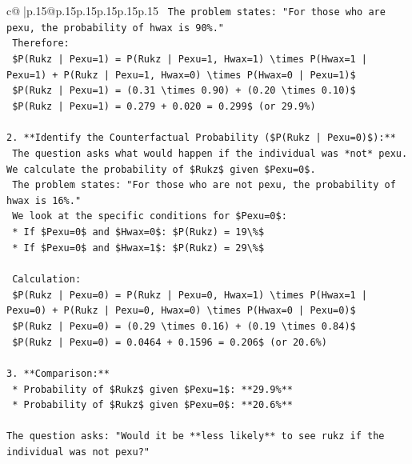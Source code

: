 \documentclass{article}
\begin{document}
{\begin{supertabular}{c@{$\;$}|p{.15\linewidth}@{}p{.15\linewidth}p{.15\linewidth}p{.15\linewidth}p{.15\linewidth}p{.15\linewidth}}
{{{\texttt{    The problem states: "For those who are pexu, the probability of hwax is 90\%."} \\
\texttt{    Therefore:} \\
\texttt{    \$P(Rukz | Pexu=1) = P(Rukz | Pexu=1, Hwax=1) \textbackslash{}times P(Hwax=1 | Pexu=1) + P(Rukz | Pexu=1, Hwax=0) \textbackslash{}times P(Hwax=0 | Pexu=1)\$} \\
\texttt{    \$P(Rukz | Pexu=1) = (0.31 \textbackslash{}times 0.90) + (0.20 \textbackslash{}times 0.10)\$} \\
\texttt{    \$P(Rukz | Pexu=1) = 0.279 + 0.020 = 0.299\$ (or 29.9\%)} \\
\\ 
\texttt{2.  **Identify the Counterfactual Probability (\$P(Rukz | Pexu=0)\$):**} \\
\texttt{    The question asks what would happen if the individual was *not* pexu. We calculate the probability of \$Rukz\$ given \$Pexu=0\$.} \\
\texttt{    The problem states: "For those who are not pexu, the probability of hwax is 16\%."} \\
\texttt{    We look at the specific conditions for \$Pexu=0\$:} \\
\texttt{    *   If \$Pexu=0\$ and \$Hwax=0\$: \$P(Rukz) = 19\textbackslash{}\%\$} \\
\texttt{    *   If \$Pexu=0\$ and \$Hwax=1\$: \$P(Rukz) = 29\textbackslash{}\%\$} \\
\\ 
\texttt{    Calculation:} \\
\texttt{    \$P(Rukz | Pexu=0) = P(Rukz | Pexu=0, Hwax=1) \textbackslash{}times P(Hwax=1 | Pexu=0) + P(Rukz | Pexu=0, Hwax=0) \textbackslash{}times P(Hwax=0 | Pexu=0)\$} \\
\texttt{    \$P(Rukz | Pexu=0) = (0.29 \textbackslash{}times 0.16) + (0.19 \textbackslash{}times 0.84)\$} \\
\texttt{    \$P(Rukz | Pexu=0) = 0.0464 + 0.1596 = 0.206\$ (or 20.6\%)} \\
\\ 
\texttt{3.  **Comparison:**} \\
\texttt{    *   Probability of \$Rukz\$ given \$Pexu=1\$: **29.9\%**} \\
\texttt{    *   Probability of \$Rukz\$ given \$Pexu=0\$: **20.6\%**} \\
\\ 
\texttt{The question asks: "Would it be **less likely** to see rukz if the individual was not pexu?"} \\
}}}
\end{supertabular}}
\end{document}
